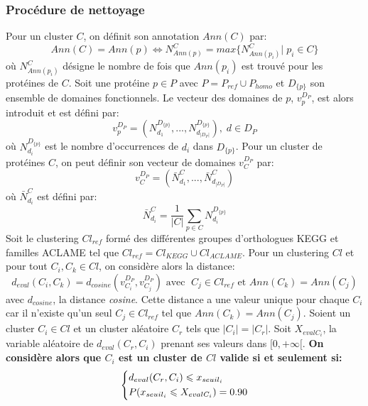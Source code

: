 \subsubsection{Procédure de nettoyage}
     Pour un cluster $C$, on définit son annotation $Ann(C)$ par:
	\begin{equation}
		Ann(C)=Ann(p) \iff N_{Ann(p)}^{C} = max\{N_{Ann(p_{i})}^{C}|\; p_{i} \in C \}
      \end{equation}
où $N_{Ann(p_{i})}^{C}$ désigne le nombre de fois que $Ann(p_{i})$ est trouvé pour les protéines de $C$.
Soit une protéine $p \in P$ avec $P=P_{ref} \cup P_{homo}$ et $D_{\{p\}}$ son ensemble de domaines fonctionnels. Le vecteur des domaines de $p$,  $v^{D_{P}}_{p}$, est alors introduit et est défini par: 
      \begin{equation}
		v^{D_{P}}_{p}=(N_{d_{1}}^{D_{\{p\}}},...,N_{d_{|D_{P}|}}^{D_{\{p\}}}),\;  d \in D_{P}
      \end{equation}
où $N_{d_{i}}^{D_{\{p\}}}$ est le nombre d'occurrences de $d_{i}$ dans $D_{\{p\}}$. Pour un cluster de protéines $C$, on peut définir son vecteur de domaines $v_{C}^{D_{P}}$ par:
      \begin{equation}
      	v_{C}^{D_{P}}=(\bar{N}_{d_{1}}^{C},...,\bar{N}_{d_{|D_{P}|}}^{C})
      \end{equation}
où $\bar{N}_{d_{i}}^{C}$ est défini par:
	\begin{equation}
       	\bar{N}_{d_{i}}^{C}=\frac{1}{|C|}\sum_{p \in C}N_{d_{i}}^{D_{\{p\}}}
	\end{equation}
Soit le clustering $Cl_{ref}$ formé des différentes groupes d'orthologues KEGG et familles ACLAME tel que $Cl_{ref}= Cl_{KEGG} \cup Cl_{ACLAME}$. Pour un clustering $Cl$ et pour tout $C_{i},C_{k} \in Cl$, on considère alors la distance:
      \begin{equation}\label{cleaningcosine}
      	d_{eval}(C_{i},C_{k})=d_{cosine}(v_{C_{i}}^{D_{P}},v_{C_{j}}^{D_{P}}) \textrm{ avec } \; C_{j} \in Cl_{ref} \textrm{ et } Ann(C_{k})=Ann(C_{j}) 
	\end{equation}       
avec $d_{cosine}$, la distance \textit{cosine}. Cette distance a une valeur unique pour chaque $C_{i}$ car il n'existe qu'un seul $C_{j} \in Cl_{ref}$ tel que $ Ann(C_{k})=Ann(C_{j})$. Soient un cluster $C_{i} \in Cl$ et un cluster aléatoire $C_{r}$ tels que $|C_{i}|=|C_{r}|$. Soit $X_{evalC_{i}}$, la variable aléatoire de $d_{eval}({C_{r},C_{i}})$ prenant ses valeurs dans $[0,+\infty[$. \textbf{On considère alors que $C_{i}$ est un cluster de $Cl$ valide si et seulement si:}
      \begin{equation}\label{eqseuil}
      	\begin{dcases}
      		d_{eval}(C_{r},C_{i})\leqslant x_{seuil_{i}}\\
      		P(x_{seuil_{i}} \leqslant X_{evalC_{i}})=0.90
      	\end{dcases}
      \end{equation}



